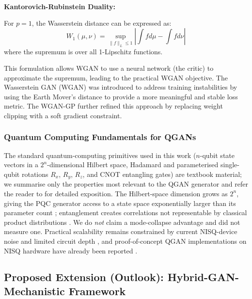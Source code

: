 \textbf{Kantorovich-Rubinstein Duality:}

For $p=1$, the Wasserstein distance can be expressed as:
\begin{equation}
W_1(\mu, \nu) = \sup_{\|f\|_L \leq 1} \left|\int f d\mu - \int f d\nu\right|
\end{equation}
where the supremum is over all 1-Lipschitz functions.

This formulation allows WGAN to use a neural network (the critic) to approximate the supremum, leading to the practical WGAN objective. \cite{arjovsky17a} The Wasserstein GAN (WGAN) was introduced to address training instabilities by using the Earth Mover's distance to provide a more meaningful and stable loss metric. \cite{arjovsky17a} The WGAN-GP further refined this approach by replacing weight clipping with a soft gradient constraint. \cite{gulrajani2017improved}

\subsubsection{Quantum Computing Fundamentals for QGANs}

The standard quantum-computing primitives used in this work ($n$-qubit
state vectors in a $2^n$-dimensional Hilbert space, Hadamard and
parameterised single-qubit rotations $R_x$, $R_y$, $R_z$, and CNOT
entangling gates) are textbook material; we summarise only the
properties most relevant to the QGAN generator and refer the reader to
\cite{Dallaire_Demers_2018, Lloyd_2018, Zoufal_2019} for detailed
exposition. The Hilbert-space dimension grows as $2^n$, giving the PQC
generator access to a state space exponentially larger than its parameter
count \cite{zoufal2021generativequantummachinelearning}; entanglement
creates correlations not representable by classical product
distributions \cite{romero2019variationalquantumgeneratorsgenerative,
Amin_2018}. We do \emph{not} claim a mode-collapse advantage and did not
measure one. Practical scalability remains constrained by current
NISQ-device noise and limited circuit depth \cite{Cerezo_2021}, and
proof-of-concept QGAN implementations on NISQ hardware have already been
reported \cite{rudolph2022generationhighresolutionhandwrittendigits,
Huang_2021}.

\subsection{Proposed Extension (Outlook): Hybrid-GAN-Mechanistic Framework}

